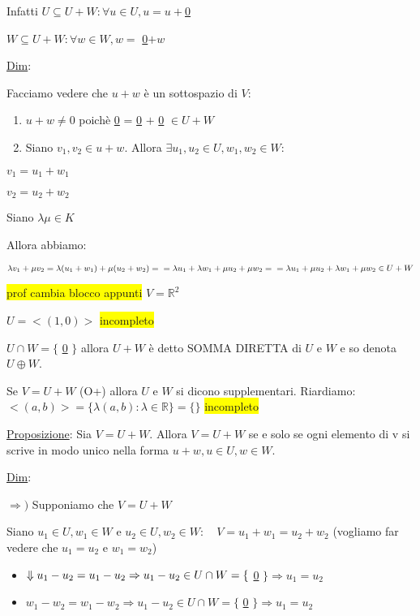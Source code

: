 \documentclass{article}
\newcommand{\hl}[1]{\colorbox{yellow}{#1}}
\newcommand{\ul}[1]{\underline{#1}}
\newcommand{\R}{\mathbb{R}}
\newcommand{\Def}[2]{\paragraph{\ul{Def}:}#1\\\hspace*{3em}\begin{minipage}{.8\textwidth}#2\end{minipage}}
\begin{document}
Infatti $U\subseteq U+W:\forall u\in U,u=u+$\ul{0}

$W\subseteq U+W:\forall w\in W,w=$ \ul{0}$+w$

\ul{Dim}:

Facciamo vedere che $u+w$ è un sottospazio di $V$:
\begin{enumerate}
	\item $u+w\not=0$ poichè \ul{0} = \ul{0} $+$ \ul{0} $\in U+W$
	\item Siano $v_1,v_2\in u+w$. Allora $\exists u_1,u_2\in U,w_1,w_2\in W:$
\end{enumerate}

$v_1=u_1+w_1$

$v_2=u_2+w_2$

Siano $\lambda\mu\in K$

Allora abbiamo:

$\lambda v_1+\mu v_2=\lambda(u_1+w_1)+\mu(u_2+w_2)=\\=\lambda u_1+\lambda w_1+\mu u_2 + \mu w_2=\\=\lambda u_1+\mu u_2+\lambda w_1+\mu w_2\in U+W$

\hl{prof cambia blocco appunti}
$V=\R^2$

$U=<(1,0)>$
\hl{incompleto}


$U\cap W=\{$ \ul{0} $\}$ allora $U+W$ è detto SOMMA DIRETTA di $U$ e $W$ e so denota $U\oplus W$.

Se $V=U+W$ (O+) allora $U$ e $W$ si dicono supplementari.
\hrulefill
Riardiamo: $<(a,b)>=\{\lambda(a,b):\lambda\in\R\}=\{\}$
\hl{incompleto}

\ul{Proposizione}: Sia $V=U+W$. Allora $V=U+W$ se e solo se ogni elemento di v si scrive in modo unico nella forma $u+w, u\in U, w\in W$.

\ul{Dim}:

$\Rightarrow)$ Supponiamo che $V=U+W$

Siano $u_1\in U,w_1\in W$ e $u_2\in U,w_2\in W:\quad V=u_1+w_1=u_2+w_2$ (vogliamo far vedere che $u_1=u_2$ e $w_1=w_2$)

\begin{itemize}
	\item $\Downarrow\\u_1-u_2=u_1-u_2\Rightarrow u_1-u_2\in U\cap W=\{$ \ul{0} $\}\Rightarrow u_1=u_2$
	\item $w_1-w_2=w_1-w_2\Rightarrow u_1-u_2\in U\cap W=\{$ \ul{0} $\}\Rightarrow u_1=u_2$
\end{itemize}
\end{document}
